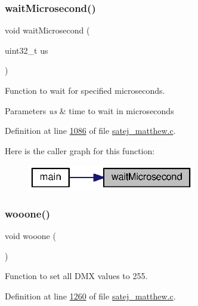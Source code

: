 \subsubsection{\texorpdfstring{waitMicrosecond()}{waitMicrosecond()}}
{\footnotesize\ttfamily void wait\+Microsecond (\begin{DoxyParamCaption}\item[{uint32\+\_\+t}]{us }\end{DoxyParamCaption})}



Function to wait for specified microseconds. 


\begin{DoxyParams}{Parameters}
{\em us} & time to wait in microseconds \\
\hline
\end{DoxyParams}


Definition at line \mbox{\hyperlink{satej__matthew_8c_source_l01086}{1086}} of file \mbox{\hyperlink{satej__matthew_8c_source}{satej\+\_\+matthew.\+c}}.

Here is the caller graph for this function\+:\nopagebreak
\begin{figure}[H]
\begin{center}
\leavevmode
\includegraphics[width=207pt]{satej__matthew_8c_af97018ae05e94f602f956c08ef08c36c_icgraph}
\end{center}
\end{figure}
\mbox{\label{satej__matthew_8c_a35d3aeb4661540f67e367e4e328c6c88}} 
\subsubsection{\texorpdfstring{wooone()}{wooone()}}
{\footnotesize\ttfamily void wooone (\begin{DoxyParamCaption}{ }\end{DoxyParamCaption})}



Function to set all D\+MX values to 255. 



Definition at line \mbox{\hyperlink{satej__matthew_8c_source_l01260}{1260}} of file \mbox{\hyperlink{satej__matthew_8c_source}{satej\+\_\+matthew.\+c}}.

